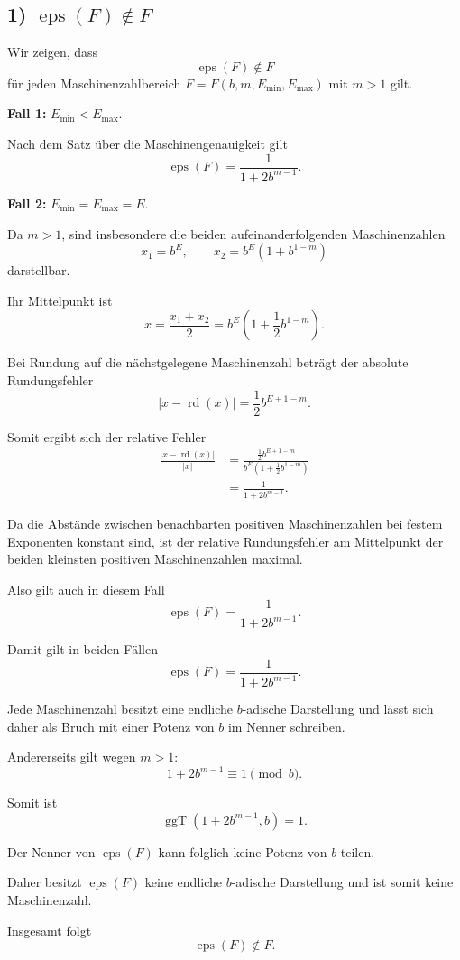 \documentclass{report}
\begin{document}
\subsection*{1) $\operatorname{eps}(F) \notin F$}
\begin{myproof}
  Wir zeigen, dass
  \[
    \operatorname{eps}(F)\notin F
  \]
  für jeden Maschinenzahlbereich
  $F=F(b,m,E_{\min},E_{\max})$
  mit $m>1$ gilt.

  \textbf{Fall 1:} $E_{\min}<E_{\max}$.

  Nach dem Satz über die Maschinengenauigkeit
  gilt
  \[
    \operatorname{eps}(F)
    =\frac{1}{1+2b^{m-1}}.
  \]

  \textbf{Fall 2:} $E_{\min}=E_{\max}=E$.

  Da $m>1$, sind insbesondere die beiden
  aufeinanderfolgenden Maschinenzahlen
  \[
    x_1=b^E,
    \qquad
    x_2=b^E(1+b^{1-m})
  \]
  darstellbar.

  Ihr Mittelpunkt ist
  \[
    x=\frac{x_1+x_2}{2}
    =b^E\left(1+\frac12b^{1-m}\right).
  \]

  Bei Rundung auf die nächstgelegene
  Maschinenzahl beträgt der absolute
  Rundungsfehler
  \[
    |x-\operatorname{rd}(x)|
    =\frac12b^{E+1-m}.
  \]

  Somit ergibt sich der relative Fehler
  \begin{align*}
    \frac{|x-\operatorname{rd}(x)|}{|x|}
    &=\frac{\frac12b^{E+1-m}}
      {b^E(1+\frac12b^{1-m})}\\
    &=\frac{1}{1+2b^{m-1}}.
  \end{align*}

  Da die Abstände zwischen benachbarten
  positiven Maschinenzahlen bei festem
  Exponenten konstant sind, ist der
  relative Rundungsfehler am Mittelpunkt
  der beiden kleinsten positiven
  Maschinenzahlen maximal.

  Also gilt auch in diesem Fall
  \[
    \operatorname{eps}(F)
    =\frac{1}{1+2b^{m-1}}.
  \]

  \medskip
  Damit gilt in beiden Fällen
  \[
    \operatorname{eps}(F)
    =\frac{1}{1+2b^{m-1}}.
  \]

  Jede Maschinenzahl besitzt eine endliche
  $b$-adische Darstellung und lässt sich
  daher als Bruch mit einer Potenz von $b$
  im Nenner schreiben.

  Andererseits gilt wegen $m>1$:
  \[
    1+2b^{m-1}\equiv1\pmod b.
  \]

  Somit ist
  \[
    \operatorname{ggT}(1+2b^{m-1},b)=1.
  \]

  Der Nenner von $\operatorname{eps}(F)$
  kann folglich keine Potenz von $b$
  teilen.

  Daher besitzt $\operatorname{eps}(F)$
  keine endliche $b$-adische Darstellung
  und ist somit keine Maschinenzahl.

  Insgesamt folgt
  \[
    \boxed{\operatorname{eps}(F)\notin F.}
  \]
\end{myproof}
\end{document}
